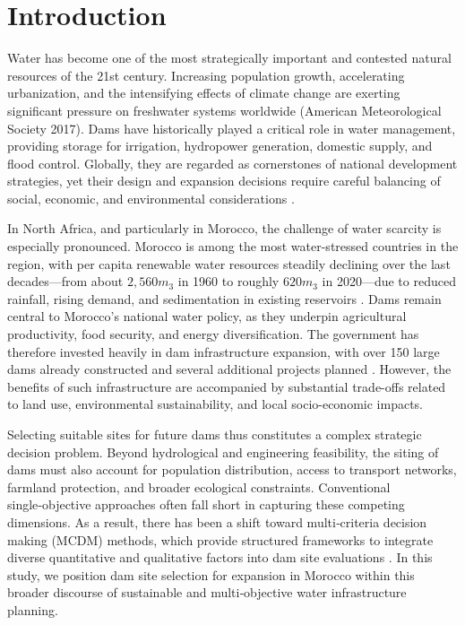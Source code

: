 \section{Introduction}\label{sec:introduction}
Water has become one of the most strategically important and contested natural resources of the 21st century. Increasing population growth, accelerating urbanization, and the intensifying effects of climate change are exerting significant pressure on freshwater systems worldwide (American Meteorological Society 2017)\cite{AMS2017}. Dams have historically played a critical role in water management, providing storage for irrigation, hydropower generation, domestic supply, and flood control. Globally, they are regarded as cornerstones of national development strategies, yet their design and expansion decisions require careful balancing of social, economic, and environmental considerations \cite{Schmitt2024,AMS2017}.

In North Africa, and particularly in Morocco, the challenge of water scarcity is especially pronounced. Morocco is among the most water-stressed countries in the region, with per capita renewable water resources steadily declining over the last decades—from about $2,560m_3$ in 1960 to roughly $620m_3$ in 2020—due to reduced rainfall, rising demand, and sedimentation in existing reservoirs \cite{WorldBank2023}. Dams remain central to Morocco’s national water policy, as they underpin agricultural productivity, food security, and energy diversification. The government has therefore invested heavily in dam infrastructure expansion, with over 150 large dams already constructed and several additional projects planned \cite{TradeGov2024}. However, the benefits of such infrastructure are accompanied by substantial trade-offs related to land use, environmental sustainability, and local socio-economic impacts.

Selecting suitable sites for future dams thus constitutes a complex strategic decision problem. Beyond hydrological and engineering feasibility, the siting of dams must also account for population distribution, access to transport networks, farmland protection, and broader ecological constraints. Conventional single‑objective approaches often fall short in capturing these competing dimensions. As a result, there has been a shift toward multi‑criteria decision making (MCDM) methods, which provide structured frameworks to integrate diverse quantitative and qualitative factors into dam site evaluations \cite{TradeGov2024,Minatour2015}. In this study, we position dam site selection  for expansion in Morocco within this broader discourse of sustainable and multi‑objective water infrastructure planning.

